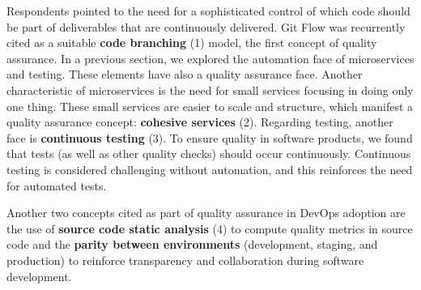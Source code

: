 Respondents pointed to the need for a sophisticated control of which code should
be part of deliverables that are continuously delivered. Git Flow was
recurrently cited as a suitable \textbf{code branching} (1) model, the first
concept of quality assurance.
In a previous section, we explored the automation face of
microservices and testing. These elements have also a quality assurance face.
Another characteristic of microservices is the need for small services focusing
in doing only one thing. These small services are easier to scale and
structure, which manifest a quality assurance concept: \textbf{cohesive
services} (2). Regarding testing, another face is \textbf{continuous
testing} (3). To ensure quality in software products, we found that
tests (as well as other quality checks) should occur continuously. Continuous testing
is considered challenging without automation, and this reinforces the need for automated
tests.

Another two concepts cited as part of quality assurance in DevOps adoption are
the use of \textbf{source code static analysis} (4) to compute quality metrics in
source code and the \textbf{parity between environments} (development, staging,
and production) to reinforce transparency and collaboration during software
development.
